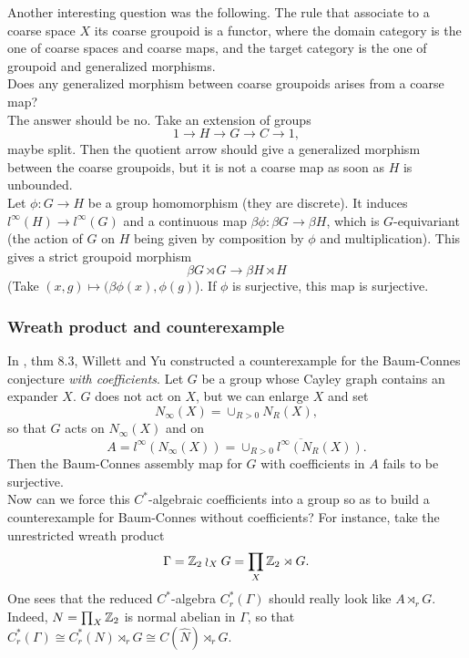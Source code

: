 Another interesting question was the following. The rule that associate to a coarse space $X$ its coarse groupoid is a functor, where the domain category is the one of coarse spaces and coarse maps, and the target category is the one of groupoid and generalized morphisms.\\

Does any generalized morphism between coarse groupoids arises from a coarse map?\\

The answer should be no. Take an extension of groups
\[1 \rightarrow H \rightarrow G \rightarrow C \rightarrow 1,\]
maybe split. Then the quotient arrow should give a generalized morphism between the coarse groupoids, but it is not a coarse map as soon as $H$ is unbounded.\\

Let $\phi: G\rightarrow H$ be a group homomorphism (they are discrete). It induces $l^\infty(H)\rightarrow l^\infty(G)$ and a continuous map $\beta \phi: \beta G\rightarrow \beta H $, which is $G$-equivariant (the action of $G$ on $H$ being given by composition by $\phi $ and multiplication). This gives a strict groupoid morphism 
\[\beta G\rtimes G \rightarrow \beta H \rtimes H\]
(Take $(x,g) \mapsto (\beta \phi(x),\phi(g)$). If $\phi$ is surjective, this map is surjective.\\
\subsubsection*{Wreath product and counterexample} In \cite{WillettYuGromov}, thm 8.3, Willett and Yu constructed a counterexample for the Baum-Connes conjecture \textit{with coefficients}. Let $G$ be a group whose Cayley graph contains an expander $X$. $G$ does not act on $X$, but we can enlarge $X$ and set 
\[N_\infty (X) = \cup_{R>0} N_R(X),\]
so that $G$ acts on $N_\infty(X)$ and on 
\[A= l^\infty(N_\infty (X)) = \overline{\cup_{R>0}l^\infty(N_R(X))}.\]
Then the Baum-Connes assembly map for $G$ with coefficients in $A$ fails to be surjective.\\

Now can we force this $C^*$-algebraic coefficients into a group so as to build a counterexample for Baum-Connes without coefficients? For instance, take the unrestricted wreath product 
\[\Gamma=\mathbb Z_2 \wr_X G = \prod_{X} \mathbb Z_2 \rtimes G.\]
One sees that the reduced $C^*$-algebra $C_r^*(\Gamma)$ should really look like $A\rtimes_r G$. Indeed, $N =\prod_X \mathbb Z_2$ is normal abelian in $\Gamma$, so that $C_r^*(\Gamma) \cong C^*_r(N)\rtimes_r G \cong C(\hat N)\rtimes_r G$.  

